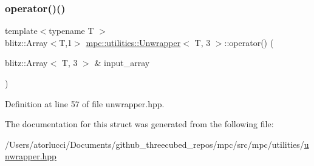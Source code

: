 \subsubsection{\texorpdfstring{operator()()}{operator()()}}
{\footnotesize\ttfamily template$<$typename T $>$ \\
blitz\+::\+Array$<$T,1$>$ \mbox{\hyperlink{structmpc_1_1utilities_1_1_unwrapper}{mpc\+::utilities\+::\+Unwrapper}}$<$ T, 3 $>$\+::operator() (\begin{DoxyParamCaption}\item[{blitz\+::\+Array$<$ T, 3 $>$ \&}]{input\+\_\+array }\end{DoxyParamCaption})\hspace{0.3cm}{\ttfamily [inline]}}



Definition at line 57 of file unwrapper.\+hpp.



The documentation for this struct was generated from the following file\+:\begin{DoxyCompactItemize}
\item 
/\+Users/atorlucci/\+Documents/github\+\_\+threecubed\+\_\+repos/mpc/src/mpc/utilities/\mbox{\hyperlink{unwrapper_8hpp}{unwrapper.\+hpp}}\end{DoxyCompactItemize}
